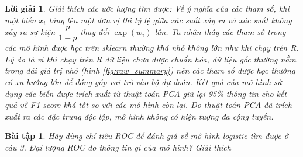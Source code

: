 \documentclass[14pt, a4paper]{article}
\theoremstyle{sltheorem}
\newtheorem{baitap}{Bài tập}
\theoremstyle{soltheorem}
\newtheorem*{loigiai}{Lời giải}
\begin{document}
\begin{loigiai}
    Giải thích các ước lượng tìm được: Về ý nghĩa của các tham số, khi một biến $x_i$ tăng lên một đơn vị thì tỷ lệ giữa xác suất xảy ra và xác suất không xảy ra sự kiện $\dfrac{p}{1 - p}$ thay đổi $\exp(w_i)$ lần.
    Ta nhận thấy các tham số trong các mô hình được học trên sklearn thường khá nhỏ không lớn như khi chạy trên R.
    Lý do là vì khi chạy trên R dữ liệu chưa được chuẩn hóa, dữ liệu gốc thường nằm trong dải giá trị nhỏ (hình \ref{fig:raw_summary}) nên các tham số được học thường có xu hướng lớn để đóng góp vai trò vào bộ dự đoán.
    Kết quả của mô hình sử dụng các biến được trích xuất từ thuật toán PCA giữ lại 95\% thông tin cho kết quả về F1 score khá tốt so với các mô hình còn lại.
    Do thuật toán PCA đã trích xuất ra các đặc trưng độc lập, mô hình không có hiện tượng đa cộng tuyến.
\end{loigiai}

\begin{baitap}
    Hãy dùng chỉ tiêu ROC để đánh giá về mô hình logistic tìm được ở câu 3. Đại lượng ROC đo thông tin gì của mô hình? Giải thích
\end{baitap}
\end{document}
